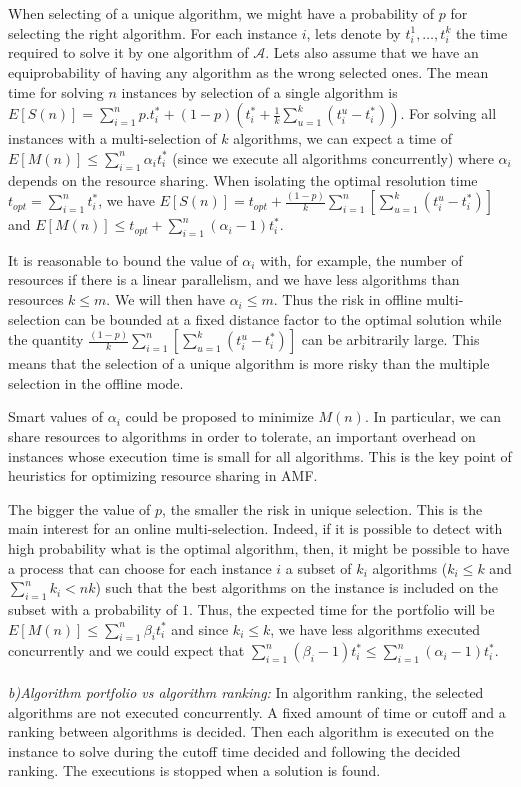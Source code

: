 When selecting of a unique algorithm, we might have a probability of $p$ for selecting the right algorithm. 
For each instance $i$, lets denote by $t_i^1, \dots, t_i^k$ the time required to solve it by one algorithm of 
$\mathcal{A}$. Lets also assume that we have an equiprobability of having any algorithm as 
the wrong selected ones. The mean time for solving $n$ instances by selection of a single algorithm is 
$E[S(n)] = \sum_{i=1}^n p.t_i^* + (1-p)(t_i^* + \frac{1}{k}\sum_{u = 1}^k (t_i^u - t_i^*))$. 
For solving all instances with a  multi-selection of $k$ algorithms, we can expect a time of 
$E[M(n)] \leq \sum_{i=1}^n \alpha_i t_i^*$ (since we execute all algorithms concurrently)  where $\alpha_i$ depends on the 
resource sharing. When isolating the optimal resolution 
time $t_{opt} = \sum_{i=1}^n t_i^*$, we have  $E[S(n)] = t_{opt} + \frac{(1-p)}{k} \sum_{i=1}^n [\sum_{u=1}^k (t_i^u - t_i^*)]$ and 
$E[M(n)] \leq t_{opt} + \sum_{i=1}^n (\alpha_i - 1)t_i^*$. 

It is reasonable to bound the value of $\alpha_i$ with, for example, the number of resources if there is a linear parallelism, and 
we have less algorithms than resources $k \leq m$. 
We will then have $\alpha_i \leq m$. Thus the risk in offline multi-selection can be bounded at a fixed distance factor 
to the optimal solution while the quantity $\frac{(1-p)}{k} \sum_{i=1}^n [ \sum_{u=1}^k (t_i^u - t_i^*) ]$ can be arbitrarily 
large. This means that the selection of a unique algorithm is more risky than the multiple selection in the offline mode. 

Smart values of $\alpha_i$ could be proposed to minimize $M(n)$. In particular, we can share 
resources to algorithms in order to tolerate, an important overhead on instances whose execution 
time is small for all algorithms. This is the key point of heuristics for optimizing resource sharing in AMF.

The bigger the value of $p$, the smaller the risk in unique selection. This is the main interest for an online multi-selection. 
Indeed, if it is possible to detect with high probability what is the optimal algorithm, then, it might be 
possible to have a process that can choose for each instance $i$ a subset of $k_i$ algorithms ($k_i \leq k$ and $\sum_{i=1}^n k_i < nk$) 
such that the best algorithms on the instance is included on the subset with a probability of $1$. Thus, the expected time for 
the portfolio will be $E[M(n)] \leq \sum_{i=1}^n \beta_i t_i^*$ and since $k_i \leq k$, we have less algorithms executed
 concurrently and we could expect that $\sum_{i=1}^n (\beta_i - 1)t_i^* \leq \sum_{i=1}^n (\alpha_i - 1)t_i^*$.\\\\
\textit{b)Algorithm portfolio vs algorithm ranking: }
In algorithm ranking, the selected algorithms are not executed concurrently. A fixed amount of 
time or cutoff and a ranking between algorithms is decided. Then each algorithm is executed on 
the instance to solve during the cutoff time decided and following the decided ranking. The 
executions is stopped when a solution is found.

